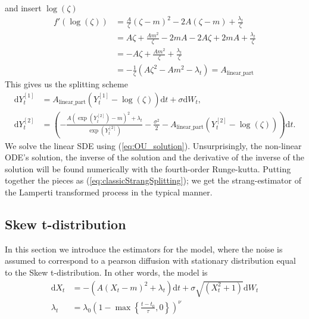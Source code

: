 and insert $\log(\zeta)$
\begin{align}
    f'(\log(\zeta)) &= \frac{A}{\zeta}\left(\zeta - m\right)^2 - 2A\left(\zeta - m\right) + \frac{\lambda_t}{\zeta}\nonumber \\
    &= A\zeta + \frac{Am^2}{\zeta} - 2mA - 2A\zeta + 2mA + \frac{\lambda_t}{\zeta}\nonumber\\
    &=-A\zeta + \frac{Am^2}{\zeta} + \frac{\lambda_t}{\zeta}\nonumber\\
    &= -\frac{1}{\zeta}\left(A\zeta^2 - Am^2 - \lambda_t\right) =  A_{\mathrm{linear\_part}}
\end{align}
This gives us the splitting scheme
\begin{align}
    \mathrm{d}Y_t^{[1]} &= A_{\mathrm{linear\_part}}\left(Y_t^{[1]} - \log\left(\zeta\right)\right)\mathrm{d}t + \sigma \mathrm{d}W_t,\\
    \mathrm{d}Y_t^{[2]} &= \left(-\frac{A\left(\exp\left(Y_t^{[2]}\right)-m\right)^2 + \lambda_t}{\exp\left(Y_t^{[2]}\right)} - \frac{\sigma^2}{2}%
    - A_{\mathrm{linear\_part}}\left(Y_t^{[2]} - \log\left(\zeta\right)\right)\right)\mathrm{d}t. \label{eq:GBMLampertiBasedStrang}
\end{align}
We solve the linear SDE using (\ref{eq:OU_solution}). Unsurprisingly, the non-linear ODE's solution, the inverse of the solution and the derivative of the inverse of the solution will be found numerically with the fourth-order Runge-kutta. Putting together the pieces as (\ref{eq:classicStrangSplitting}); we get the strang-estimator of the Lamperti transformed process in the typical manner.
\newpage
\subsection{Skew t-distribution}
In this section we introduce the estimators for the model, where the noise is assumed to correspond to a pearson diffusion with stationary distribution equal to the Skew t-distribution. In other words, the model is
\begin{align}
    \mathrm{d}X_t &= -\left(A\left(X_t - m\right)^2 + \lambda_t\right)\mathrm{d}t + \sigma \sqrt{\left(X_t^2 + 1\right)} \mathrm{d}W_t\\
    \lambda_t &= \lambda_0\left(1 - \max\left\{\frac{t - t_0}{\tau}, 0\right\}\right)^\nu
\end{align}
